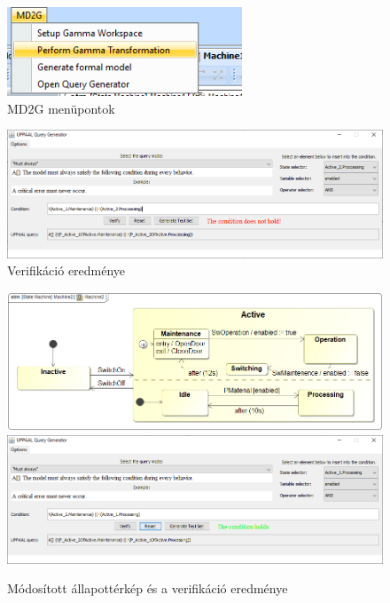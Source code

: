 \begin{figure}[H]
	\centering
	\includegraphics[keepaspectratio, width=70mm]{figures/GammaTrafo.png}
	\caption{MD2G menüpontok}
\end{figure}

\begin{figure}[H]
	\centering
	\includegraphics[keepaspectratio, width=150mm]{figures/query-gen-result.png}
	\caption{Verifikáció eredménye}
\end{figure}

\begin{figure}[H]
	\centering
	\includegraphics[keepaspectratio, width=150mm]{figures/machine2.png}
	\includegraphics[keepaspectratio, width=150mm]{figures/fixed-result.png}
	\caption{Módosított állapottérkép és a verifikáció eredménye}
\end{figure}

